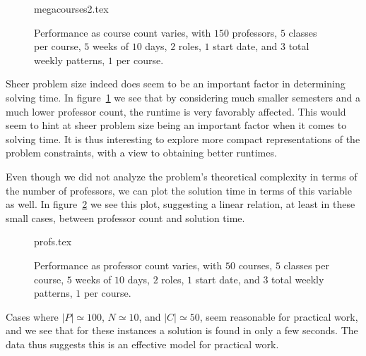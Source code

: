 \begin{figure}
  \begin{center}
    {megacourses2.tex}
    \caption{Performance as course count varies, with $150$ professors, $5$ classes per course, $5$ weeks of $10$ days, $2$ roles, $1$ start date, and $3$ total weekly patterns, $1$ per course.}
    \label{bench:megacourses2}
  \end{center}
\end{figure}

Sheer problem size indeed does seem to be an important factor in determining solving time. In figure~\ref{bench:megacourses2} we see that by considering much smaller semesters and a much lower professor count, the runtime is very favorably affected. This would seem to hint at sheer problem size being an important factor when it comes to solving time. It is thus interesting to explore more compact representations of the problem constraints, with a view to obtaining better runtimes.

Even though we did not analyze the problem's theoretical complexity in terms of the number of professors, we can plot the solution time in terms of this variable as well. In figure~\ref{bench:profs} we see this plot, suggesting a linear relation, at least in these small cases, between professor count and solution time.

\begin{figure}
  \begin{center}
    {profs.tex}
    \caption{Performance as professor count varies, with $50$ courses, $5$ classes per course, $5$ weeks of $10$ days, $2$ roles, $1$ start date, and $3$ total weekly patterns, $1$ per course.}
    \label{bench:profs}
  \end{center}
\end{figure}

Cases where $|P| \simeq 100$, $N \simeq 10$, and $|C| \simeq 50$, seem reasonable for practical work, and we see that for these instances a solution is found in only a few seconds. The data thus suggests this is an effective model for practical work.


